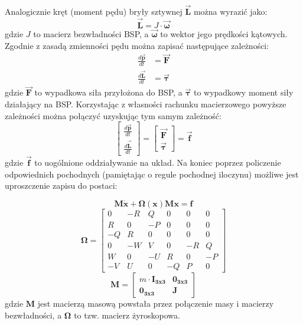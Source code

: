 Analogicznie kręt (moment pędu) bryły sztywnej $\bm{\vec{L}}$ można wyrazić jako:
\[
	\bm{\vec{L}} = J \cdot \bm{\vec{\omega}}
\]
gdzie $J$ to macierz bezwładności BSP, a $\bm{\vec{\omega}}$ to wektor jego prędkości kątowych. Zgodnie z zasadą zmienności pędu można zapisać następujące zależności:
\[
	\begin{aligned}
	\frac{d\bm{\vec{p}}}{dt} & = \bm{\vec{F}}\\
	\frac{d\bm{\vec{L}}}{dt} & = \bm{\vec{\tau}}
	\end{aligned}
\]
gdzie $\bm{\vec{F}}$ to wypadkowa siła przyłożona do BSP, a $\bm{\vec{\tau}}$ to wypadkowy moment siły działający na BSP. Korzystając z własności rachunku macierzowego powyższe zależności można połączyć uzyskując tym samym zależność:
\[
              \begin{bmatrix}\frac{d\bm{\vec{p}}}{dt}\\ \frac{d\bm{\vec{L}}}{dt} \end{bmatrix} = \begin{bmatrix}\bm{\vec{F}}\\ \bm{\vec{\tau}} \end{bmatrix} = \bm{\vec{f}}
\]
gdzie $\bm{\vec{f}}$ to uogólnione oddziaływanie na układ. Na koniec poprzez policzenie odpowiednich pochodnych (pamiętając o regule pochodnej iloczynu) możliwe jest uproszczenie zapisu do postaci:

\[
	\bm{M} \bm{\dot{x}} +  \bm{\Omega} \left( \bm{x} \right) \bm{M} \bm{x} = \bm{f}
\]
\[
	\bm{\Omega} = \begin{bmatrix}
	0 & -R & Q & 0 & 0 & 0 \\
	R & 0 & -P & 0 & 0 & 0 \\
	-Q & R & 0 & 0 & 0 & 0 \\
	0 & -W & V & 0 & -R & Q \\
	W & 0 & -U & R & 0 & -P \\
	-V & U & 0 & -Q & P & 0 
	\end{bmatrix}
\]
\[
	\bm{M} = \begin{bmatrix}
	m\cdot \bm{ I_{3x3}} & \bm{0_{3x3}} \\ \bm{0_{3x3}} & \bm{J}
	\end{bmatrix}
\]
gdzie $\bm{M}$ jest macierzą masową powstała przez połączenie masy i macierzy bezwładności, a $\bm{\Omega}$ to tzw. macierz żyroskopowa.\\

